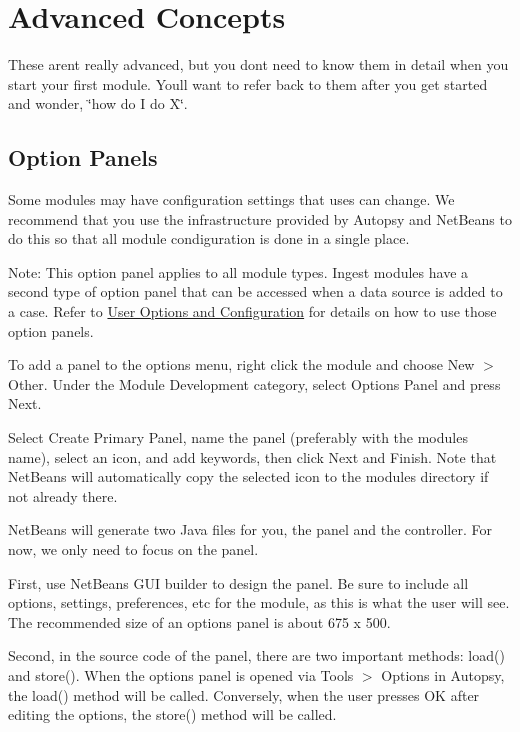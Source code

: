 \hypertarget{adv_dev_page_mod_dev_adv}{}\section{Advanced Concepts}\label{adv_dev_page_mod_dev_adv}
These aren\textquotesingle{}t really advanced, but you don\textquotesingle{}t need to know them in detail when you start your first module. You\textquotesingle{}ll want to refer back to them after you get started and wonder, \char`\"{}how do I do X\char`\"{}.\hypertarget{adv_dev_page_mod_dev_adv_options}{}\subsection{Option Panels}\label{adv_dev_page_mod_dev_adv_options}
Some modules may have configuration settings that uses can change. We recommend that you use the infrastructure provided by Autopsy and Net\+Beans to do this so that all module condiguration is done in a single place.

Note\+: This option panel applies to all module types. Ingest modules have a second type of option panel that can be accessed when a data source is added to a case. Refer to \hyperlink{mod_ingest_page_ingest_modules_making_options}{User Options and Configuration} for details on how to use those option panels.

To add a panel to the options menu, right click the module and choose New $>$ Other. Under the Module Development category, select Options Panel and press Next.

Select Create Primary Panel, name the panel (preferably with the module\textquotesingle{}s name), select an icon, and add keywords, then click Next and Finish. Note that Net\+Beans will automatically copy the selected icon to the module\textquotesingle{}s directory if not already there.

Net\+Beans will generate two Java files for you, the panel and the controller. For now, we only need to focus on the panel.

First, use Net\+Beans\textquotesingle{} G\+UI builder to design the panel. Be sure to include all options, settings, preferences, etc for the module, as this is what the user will see. The recommended size of an options panel is about 675 x 500.

Second, in the source code of the panel, there are two important methods\+: {\ttfamily load()} and {\ttfamily store()}. When the options panel is opened via Tools $>$ Options in Autopsy, the {\ttfamily load()} method will be called. Conversely, when the user presses OK after editing the options, the {\ttfamily store()} method will be called.

